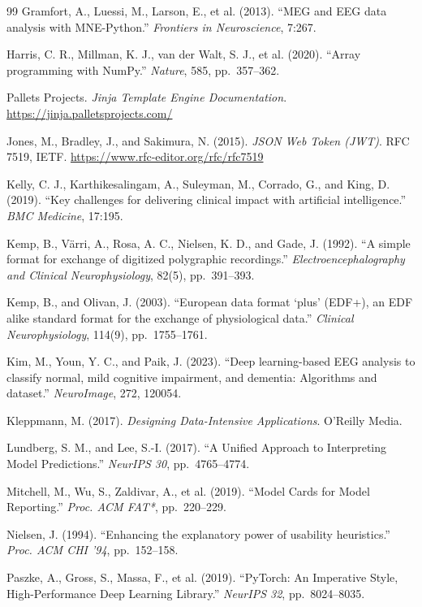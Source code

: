 \documentclass[11pt,a4paper]{article}
\begin{document}
{\begin{thebibliography}{99}
 Gramfort, A., Luessi, M., Larson, E., et al. (2013). ``MEG and EEG data analysis with MNE-Python.'' \emph{Frontiers in Neuroscience}, 7:267.

 Harris, C. R., Millman, K. J., van der Walt, S. J., et al. (2020). ``Array programming with NumPy.'' \emph{Nature}, 585, pp.~357--362.

 Pallets Projects. \emph{Jinja Template Engine Documentation}. \url{https://jinja.palletsprojects.com/}

 Jones, M., Bradley, J., and Sakimura, N. (2015). \emph{JSON Web Token (JWT)}. RFC 7519, IETF. \url{https://www.rfc-editor.org/rfc/rfc7519}

 Kelly, C. J., Karthikesalingam, A., Suleyman, M., Corrado, G., and King, D. (2019). ``Key challenges for delivering clinical impact with artificial intelligence.'' \emph{BMC Medicine}, 17:195.

 Kemp, B., V\"arri, A., Rosa, A. C., Nielsen, K. D., and Gade, J. (1992). ``A simple format for exchange of digitized polygraphic recordings.'' \emph{Electroencephalography and Clinical Neurophysiology}, 82(5), pp.~391--393.

 Kemp, B., and Olivan, J. (2003). ``European data format `plus' (EDF+), an EDF alike standard format for the exchange of physiological data.'' \emph{Clinical Neurophysiology}, 114(9), pp.~1755--1761.

 Kim, M., Youn, Y. C., and Paik, J. (2023). ``Deep learning-based EEG analysis to classify normal, mild cognitive impairment, and dementia: Algorithms and dataset.'' \emph{NeuroImage}, 272, 120054.

 Kleppmann, M. (2017). \emph{Designing Data-Intensive Applications}. O'Reilly Media.

 Lundberg, S. M., and Lee, S.-I. (2017). ``A Unified Approach to Interpreting Model Predictions.'' \emph{NeurIPS 30}, pp.~4765--4774.

 Mitchell, M., Wu, S., Zaldivar, A., et al. (2019). ``Model Cards for Model Reporting.'' \emph{Proc. ACM FAT*}, pp.~220--229.

 Nielsen, J. (1994). ``Enhancing the explanatory power of usability heuristics.'' \emph{Proc. ACM CHI '94}, pp.~152--158.

 Paszke, A., Gross, S., Massa, F., et al. (2019). ``PyTorch: An Imperative Style, High-Performance Deep Learning Library.'' \emph{NeurIPS 32}, pp.~8024--8035.


\end{thebibliography}}
\end{document}
